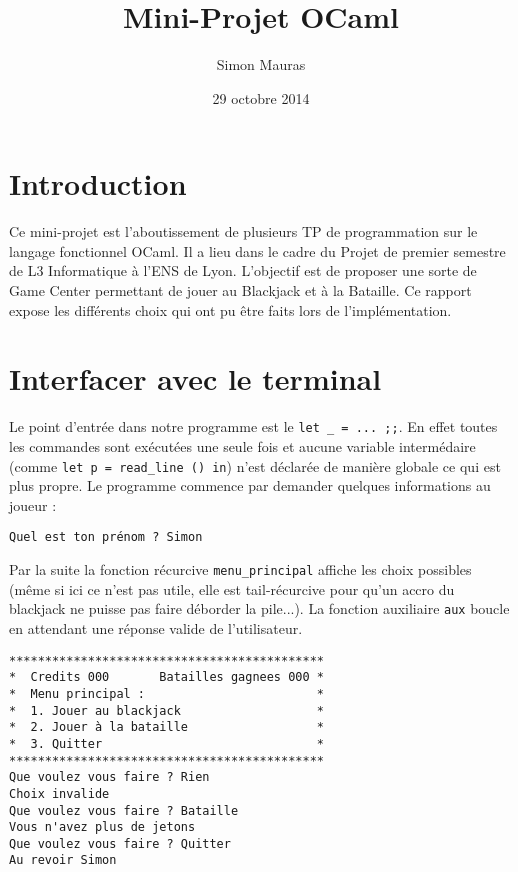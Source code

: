 \documentclass[a4paper]{article}
\title{Mini-Projet OCaml}
\author{Simon Mauras}
\date{29 octobre 2014}
\begin{document}
  
  \maketitle
  
  \tableofcontents
  
  \section{Introduction}

  Ce mini-projet est l'aboutissement de plusieurs TP de programmation sur le langage fonctionnel OCaml. Il a lieu dans le cadre du Projet de premier semestre de L3 Informatique à l'ENS de Lyon. L'objectif est de proposer une sorte de Game Center permettant de jouer au Blackjack et à la Bataille. Ce rapport expose les différents choix qui ont pu être faits lors de l'implémentation.

  \section{Interfacer avec le terminal}

  Le point d'entrée dans notre programme est le \verb|let _ = ... ;;|. En effet toutes les commandes sont exécutées une seule fois et aucune variable intermédaire (comme \verb|let p = read_line () in|) n'est déclarée de manière globale ce qui est plus propre.
  Le programme commence par demander quelques informations au joueur :
\begin{verbatim}  
Quel est ton prénom ? Simon
\end{verbatim}
  
  Par la suite la fonction récurcive \verb|menu_principal| affiche les choix possibles (même si ici ce n'est pas utile, elle est tail-récurcive pour qu'un accro du blackjack ne puisse pas faire déborder la pile...). La fonction auxiliaire \verb|aux| boucle en attendant une réponse valide de l'utilisateur.
  
\begin{verbatim}
********************************************
*  Credits 000       Batailles gagnees 000 *
*  Menu principal :                        *
*  1. Jouer au blackjack                   *
*  2. Jouer à la bataille                  *
*  3. Quitter                              *
********************************************
Que voulez vous faire ? Rien
Choix invalide
Que voulez vous faire ? Bataille
Vous n'avez plus de jetons
Que voulez vous faire ? Quitter
Au revoir Simon
\end{verbatim}
\end{document}
